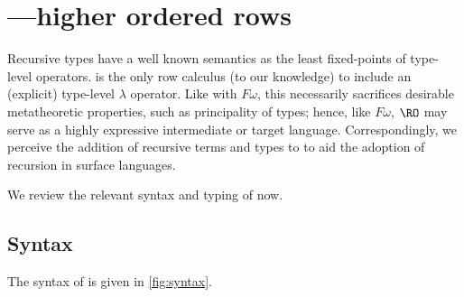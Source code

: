 \documentclass[authoryear,acmsmall,screen]{acmart}
\begin{document}
\section{\RO---higher ordered rows}
\label{app:RO}

Recursive types have a well known semantics as the least fixed-points of type-level operators. \RO is the only row calculus (to our knowledge) to include an (explicit) type-level $\lambda$ operator. Like with $F\omega$, this necessarily sacrifices desirable metatheoretic properties, such as principality of types; hence, like $F\omega$, $\RO$ may serve as a highly expressive intermediate or target language. Correspondingly, we perceive the addition of recursive terms and types to \RO to aid the adoption of recursion in surface languages.

We review the relevant syntax and typing of \RO now.

{}

\subsection{Syntax}
\label{sec:ro-syntax}

The syntax of \RO [\Thy] is given in \cref{fig:syntax}.  
\end{document}
